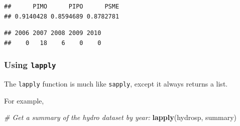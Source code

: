 \documentclass[]{book}
\newenvironment{Shaded}{\begin{snugshade}}{\end{snugshade}}
\newcommand{\CommentTok}[1]{\textcolor[rgb]{0.56,0.35,0.01}{\textit{#1}}}
\newcommand{\ControlFlowTok}[1]{\textcolor[rgb]{0.13,0.29,0.53}{\textbf{#1}}}
\newcommand{\DecValTok}[1]{\textcolor[rgb]{0.00,0.00,0.81}{#1}}
\newcommand{\KeywordTok}[1]{\textcolor[rgb]{0.13,0.29,0.53}{\textbf{#1}}}
\newcommand{\NormalTok}[1]{#1}
\newcommand{\OperatorTok}[1]{\textcolor[rgb]{0.81,0.36,0.00}{\textbf{#1}}}
\newcommand{\StringTok}[1]{\textcolor[rgb]{0.31,0.60,0.02}{#1}}
\begin{document}
\begin{verbatim}
##      PIMO      PIPO      PSME 
## 0.9140428 0.8594689 0.8782781
\end{verbatim}

\begin{Shaded}
\end{Shaded}

\begin{verbatim}
## 2006 2007 2008 2009 2010 
##    0   18    6    0    0
\end{verbatim}

\hypertarget{using-lapply}{%
\subsubsection{\texorpdfstring{Using \texttt{lapply}}{Using lapply}}\label{using-lapply}}

The \texttt{lapply} function is much like \texttt{sapply}, except it always returns a list.

For example,

\begin{Shaded}
\begin{Highlighting}[]
\CommentTok{# Get a summary of the hydro dataset by year:}
\KeywordTok{lapply}\NormalTok{(hydrosp, summary)}
\end{Highlighting}
\end{Shaded}
\end{document}
